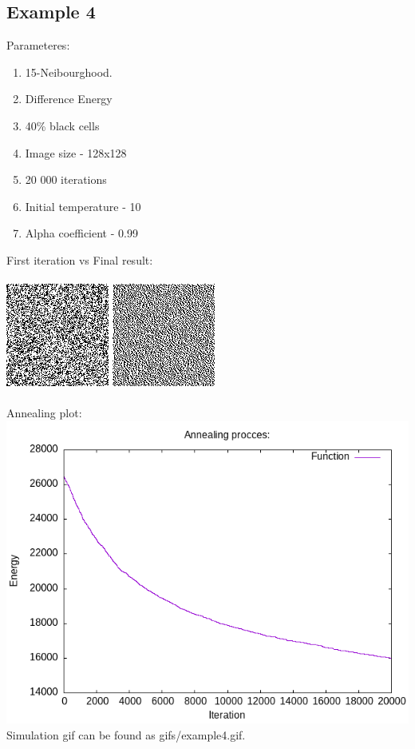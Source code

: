 \documentclass{article}
\begin{document}
\subsection*{Example 4}
Parameteres:
\begin{enumerate}
    \item 15-Neibourghood.
    \item Difference Energy
    \item 40\% black cells
    \item Image size - 128x128
    \item 20 000 iterations
    \item Initial temperature - 10
    \item Alpha coefficient - 0.99
\end{enumerate}
First iteration vs Final result:
\\\\
\includegraphics*[width = 0.4\linewidth ]{output/fifth/first_iter.png}
\includegraphics*[width = 0.4\linewidth ]{output/fifth/final_result.png}
\\\\
Annealing plot:
\\
\includegraphics*[width = 0.8\linewidth ]{output/fifth/annealing_plot.png}
\\
Simulation gif can be found as gifs/example4.gif. 
\end{document}
